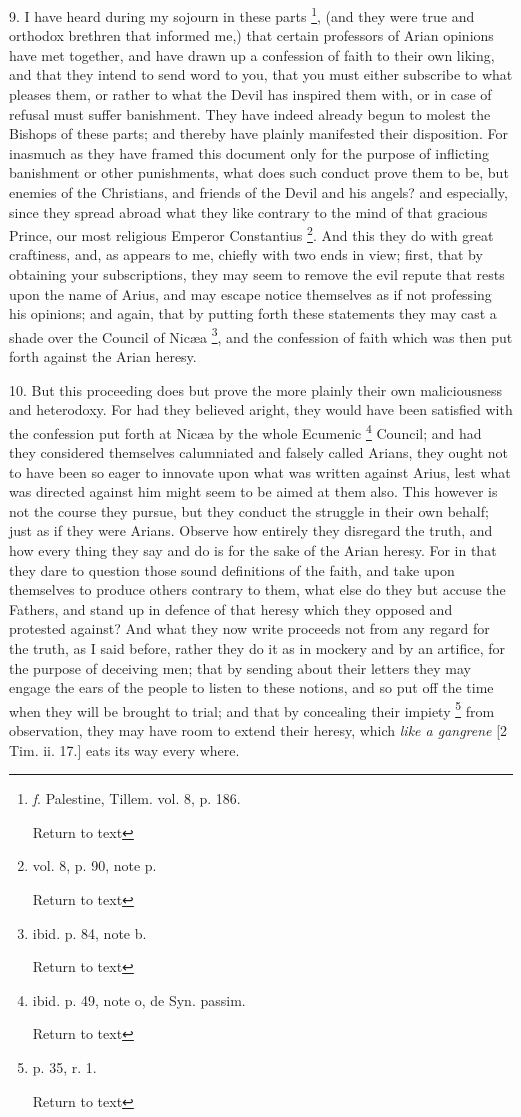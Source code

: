 9. I have heard during my sojourn in these parts
\footnote{\emph{f}. Palestine, Tillem. vol. 8, p. 186.

Return to text}, (and they were true
and orthodox brethren that informed me,) that certain professors of
Arian opinions have met together, and have drawn up a confession of
faith to their own liking, and that they intend to send word to you,
that you must either subscribe to what pleases them, or rather to what
the Devil has inspired them with, or in case of refusal must suffer
banishment. They have indeed already begun to molest the Bishops of
these parts; and thereby have plainly manifested their disposition.
For inasmuch as they have framed this document only for the purpose of
inflicting banishment or other punishments, what does such
conduct prove them to be, but enemies of the Christians, and friends
of the Devil and his angels? and especially, since they spread abroad
what they like contrary to the mind of that gracious Prince, our most
religious Emperor Constantius \footnote{vol. 8, p. 90, note p.

Return to text}. And this they do with great craftiness, and, as appears to
me, chiefly with two ends in view; first, that by obtaining your
subscriptions, they may seem to remove the evil repute that rests upon
the name of Arius, and may escape notice themselves as if not
professing his opinions; and again, that by putting forth these
statements they may cast a shade over the Council of Nicæa \footnote{ibid. p. 84, note b.

Return to text}, and the confession of faith which was then put forth against
the Arian heresy.

10. But this proceeding does but prove the more
plainly their own maliciousness and heterodoxy. For had they believed
aright, they would have been satisfied with the confession put forth
at Nicæa by the whole Ecumenic \footnote{ibid. p. 49, note o, de Syn. passim.

Return to text} Council; and had they considered themselves calumniated and
falsely called Arians, they ought not to have been so eager to
innovate upon what was written against Arius, lest what was directed
against him might seem to be aimed at them also. This however is not
the course they pursue, but they conduct the struggle in their own
behalf; just as if they were Arians. Observe how entirely they
disregard the truth, and how every thing they say and do is for the
sake of the Arian heresy. For in that they dare to question those
sound definitions of the faith, and take upon themselves to produce
others contrary to them, what else do they but accuse the Fathers, and
stand up in defence of that heresy which they opposed and protested
against? And what they now write proceeds not from any regard for the
truth, as I said before, rather they do it as in mockery and by an
artifice, for the purpose of deceiving men; that by sending about
their letters they may engage the ears of the people to listen to
these notions, and so put off the time when they will be brought to
trial; and that by concealing their impiety \footnote{p. 35, r. 1.

Return to text} from observation, they may have room to extend their heresy,
which \emph{like a gangrene} [2 Tim. ii. 17.] eats its way every
where.

